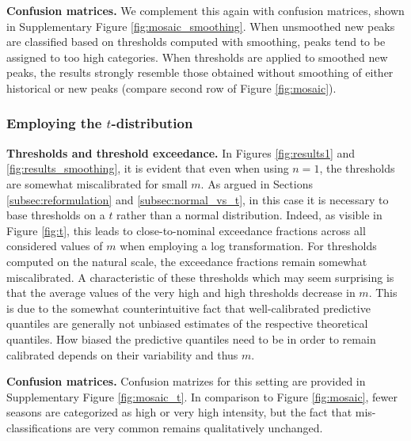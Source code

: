 \documentclass[12pt]{article}
\begin{document}
\textbf{Confusion matrices.} We complement this again with confusion matrices, shown in Supplementary Figure \ref{fig:mosaic_smoothing}. When unsmoothed new peaks are classified based on thresholds computed with smoothing, peaks tend to be assigned to too high categories. When thresholds are applied to smoothed new peaks, the results strongly resemble those obtained without smoothing of either historical or new peaks (compare second row of Figure \ref{fig:mosaic}).


\subsubsection{Employing the $t$-distribution}

\textbf{Thresholds and threshold exceedance.} In Figures \ref{fig:results1} and \ref{fig:results_smoothing}, it is evident that even when using $n = 1$, the thresholds are somewhat miscalibrated for small $m$. As argued in Sections \ref{subsec:reformulation} and \ref{subsec:normal_vs_t}, in this case it is necessary to base thresholds on a $t$ rather than a normal distribution. Indeed, as visible in Figure \ref{fig:t}, this leads to close-to-nominal exceedance fractions across all considered values of $m$ when employing a log transformation. For thresholds computed on the natural scale, the exceedance fractions remain somewhat miscalibrated. A characteristic of these thresholds which may seem surprising is that the average values of the very high and high thresholds decrease in $m$. This is due to the somewhat counterintuitive fact that well-calibrated predictive quantiles are generally not unbiased estimates of the respective theoretical quantiles. How biased the predictive quantiles need to be in order to remain calibrated depends on their variability and thus $m$.

\textbf{Confusion matrices.} Confusion matrizes for this setting are provided in Supplementary Figure \ref{fig:mosaic_t}. In comparison to Figure \ref{fig:mosaic}, fewer seasons are categorized as high or very high intensity, but the fact that mis-classifications are very common remains qualitatively unchanged.
\end{document}

